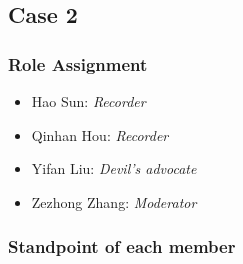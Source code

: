 	\subsection{Case 2}
		\subsubsection{Role Assignment}
		\begin{itemize}
  			\item Hao Sun: \emph{Recorder}
  			\item Qinhan Hou: \emph{Recorder}
  			\item Yifan Liu: \emph{Devil’s advocate}
  			\item Zezhong Zhang: \emph{Moderator}
		\end{itemize}
		\subsubsection{Standpoint of each member}
